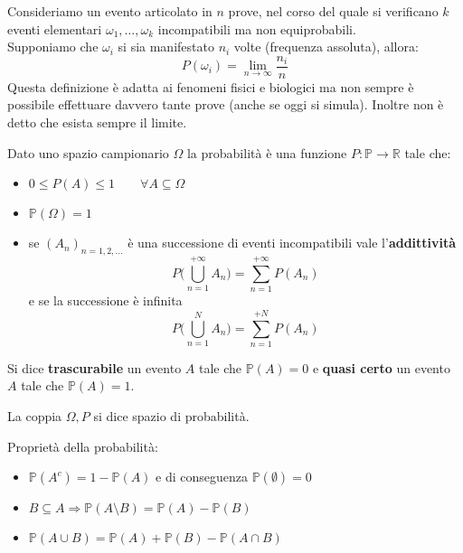 \begin{definition}
	Consideriamo un evento articolato in $n$ prove, nel corso del quale si verificano $k$ eventi elementari $\omega_1, \ldots, \omega_k$ incompatibili ma non equiprobabili.\\
	Supponiamo che $\omega_i$ si sia manifestato $n_i$ volte (frequenza assoluta), allora:
	\begin{equation}
		P(\omega_i) = \lim_{n \to \infty}\frac{n_i}{n}
	\end{equation}
	Questa definizione è adatta ai fenomeni fisici e biologici ma non sempre è possibile effettuare davvero tante prove (anche se oggi si simula). Inoltre non è detto che esista sempre il limite.
\end{definition}

\begin{definition}
	Dato uno spazio campionario $\Omega$ la probabilità è una funzione $P:\mathbb{P}\to \mathbb{R}$ tale che:
	\begin{itemize}
		\item $0 \leq P(A) \leq 1 \qquad \forall A \subseteq \Omega$
		\item $\mathbb{P}(\Omega)=1$
		\item se $(A_n)_{n=1,2,\ldots}$ è una successione di eventi incompatibili vale l'\textbf{addittività}
		\begin{equation}
			P\bigg(\bigcup_{n=1}^{+\infty}A_n\bigg) = \sum_{n=1}^{+\infty}P(A_n)
		\end{equation}
		e se la successione è infinita
		\begin{equation}
			P\bigg(\bigcup_{n=1}^{N}A_n\bigg) = \sum_{n=1}^{+N}P(A_n)
		\end{equation}
	\end{itemize}
\end{definition}

\begin{note}
	Si dice \textbf{trascurabile} un evento $A$ tale che $\mathbb{P}(A)=0$ e \textbf{quasi certo} un evento $A$ tale che $\mathbb{P}(A)=1$. 
\end{note}

\begin{definition}
	La coppia $\Omega, P$ si dice spazio di probabilità.
\end{definition}

\begin{proposition}
	Proprietà della probabilità:
	\begin{itemize}
		\item $\mathbb{P}(A^c)=1-\mathbb{P}(A)$ e di conseguenza $\mathbb{P}(\emptyset)=0$
		\item $B \subseteq A \Longrightarrow \mathbb{P}(A\setminus B)=\mathbb{P}(A) - \mathbb{P}(B)$
		\item $\mathbb{P}(A\cup B)=\mathbb{P}(A)+\mathbb{P}(B)-\mathbb{P}(A \cap B)$
	\end{itemize}
\end{proposition}

